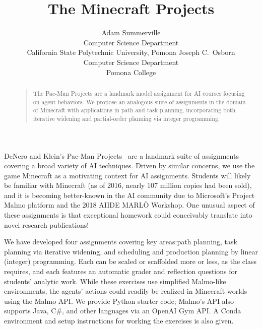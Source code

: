 \documentclass[letterpaper]{article}
\begin{document}
% 
\title{The Minecraft Projects}
\author{Adam Summerville\\Computer Science Department\\California State Polytechnic University, Pomona \And Joseph C.\ Osborn\\Computer Science Department\\Pomona College}
\maketitle
\begin{abstract}
  \begin{quote}
    The Pac-Man Projects are a landmark model assignment for AI courses focusing on agent behaviors.  We propose an analogous suite of assignments in the domain of Minecraft with applications in path and task planning, incorporating both iterative widening and partial-order planning via integer programming.
  \end{quote}
\end{abstract}

DeNero and Klein's Pac-Man Projects~\cite{denero2010teaching} are a landmark suite of assignments covering a broad variety of AI techniques.
Driven by similar concerns, we use the game Minecraft as a motivating context for AI assignments.
Students will likely be familiar with Minecraft (as of 2016, nearly 107 million copies had been sold), and it is becoming better-known in the AI community due to Microsoft's Project Malmo platform and the 2018 AIIDE MARL\"{O} Workshop.
One unusual aspect of these assignments is that exceptional homework could conceivably translate into novel research publications!

We have developed four assignments covering key areas:\@ path planning, task planning via iterative widening, and scheduling and production planning by linear (integer) programming.
Each can be scaled or scaffolded more or less, as the class requires, and each features an automatic grader and reflection questions for students' analytic work.
While these exercises use simplified Malmo-like environments, the agents' actions could readily be realized in Minecraft worlds using the Malmo API.\@
We provide Python starter code; Malmo's API also supports Java, C\#, and other languages via an OpenAI Gym API.
A Conda environment and setup instructions for working the exercises is also given.



\end{document}
